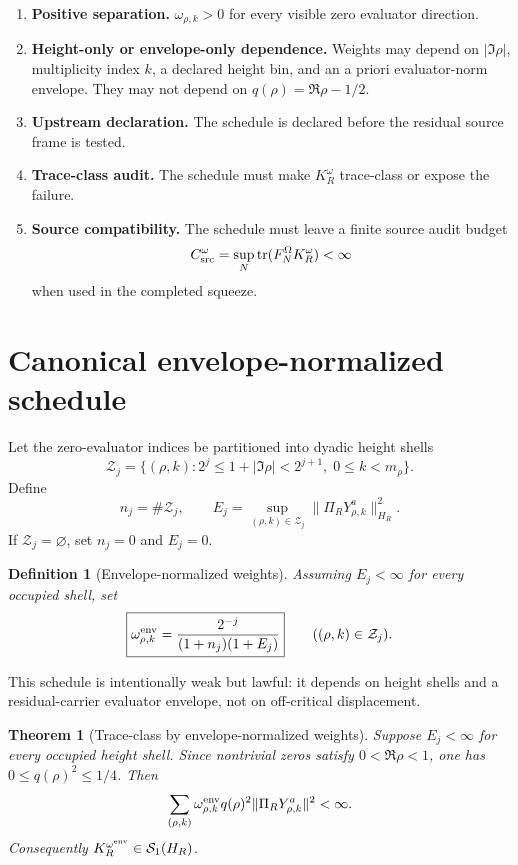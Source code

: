 \documentclass[11pt]{article}
\newtheorem{theorem}{Theorem}
\newtheorem{definition}{Definition}
\begin{document}
\begin{enumerate}[label=\textbf{W\arabic*.}]
\item \textbf{Positive separation.} $\omega_{\rho,k}>0$ for every visible zero evaluator direction.
\item \textbf{Height-only or envelope-only dependence.} Weights may depend on $|\Im\rho|$, multiplicity index $k$, a declared height bin, and an a priori evaluator-norm envelope. They may not depend on $q(\rho)=\Re\rho-1/2$.
\item \textbf{Upstream declaration.} The schedule is declared before the residual source frame is tested.
\item \textbf{Trace-class audit.} The schedule must make $K_R^\omega$ trace-class or expose the failure.
\item \textbf{Source compatibility.} The schedule must leave a finite source audit budget
\[
  C_{\rm src}^\omega=\sup_N\operatorname{tr}(F_N^\Omega K_R^\omega)<\infty
\]
when used in the completed squeeze.
\end{enumerate}

\section{Canonical envelope-normalized schedule}
Let the zero-evaluator indices be partitioned into dyadic height shells
\[
  \mathcal Z_j=\{(\rho,k):2^j\le 1+|\Im\rho|<2^{j+1},\;0\le k<m_\rho\}.
\]
Define
\[
  n_j=\#\mathcal Z_j,
  \qquad
  E_j=\sup_{(\rho,k)\in\mathcal Z_j}\|\Pi_RY^a_{\rho,k}\|_{H_R}^2.
\]
If $\mathcal Z_j=\varnothing$, set $n_j=0$ and $E_j=0$.

\begin{definition}[Envelope-normalized weights]
Assuming $E_j<\infty$ for every occupied shell, set
\[
  \boxed{
  \omega_{\rho,k}^{\rm env}
  =
  \frac{2^{-j}}{(1+n_j)(1+E_j)}
  }
  \qquad ((\rho,k)\in\mathcal Z_j).
\]
\end{definition}

This schedule is intentionally weak but lawful: it depends on height shells and a residual-carrier evaluator envelope, not on off-critical displacement.

\begin{theorem}[Trace-class by envelope-normalized weights]
Suppose $E_j<\infty$ for every occupied height shell. Since nontrivial zeros satisfy $0<\Re\rho<1$, one has $0\le q(\rho)^2\le 1/4$. Then
\[
  \sum_{(\rho,k)}\omega^{\rm env}_{\rho,k}q(\rho)^2
  \|\Pi_RY^a_{\rho,k}\|^2<\infty.
\]
Consequently $K_R^{\omega^{\rm env}}\in\mathcal S_1(H_R)$.
\end{theorem}
\end{document}
